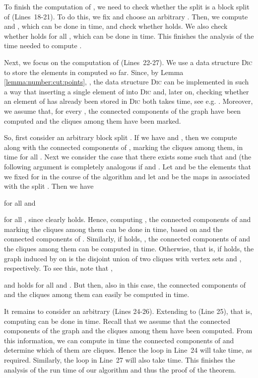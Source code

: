 \documentclass[12pt]{article}
\begin{document}
To finish the computation of , we need to check whether
the split  is a block split of  (Lines~18-21). 
To do this, we fix  and choose an arbitrary .
Then, we compute  and ,
which can be done in  time, and check whether 
 holds.
We also check whether  holds for all ,
which can be done in  time. 
This finishes the analysis of the time needed to compute .

Next, we focus on the computation of  (Lines~22-27).
We use a data structure \textsc{Dic}
to store the elements in  computed so far. 
Since, by Lemma \ref{lemma:number:cut:points},
, the data structure \textsc{Dic} can be implemented in such a way
that inserting a single element of  into \textsc{Dic} and, later on, 
checking whether an element of  has
already been stored in \textsc{Dic} both takes  time, see e.g. \cite{gon-00a}.
Moreover, we assume that, for every ,
the connected components of the graph  have been computed
and the cliques among them have been marked. 

So, first consider an arbitrary block split .
If we have  and , then
we compute  along with the connected components of ,
marking the cliques among them, in  time for all . 
Next we consider the case that there exists some 
such that  and  (the following argument is completely 
analogous if  and .
Let  and  be the elements that we fixed
for  in the course of the algorithm and
let  and  be the maps in 
associated with the split .
Then we have 
 
for all  and

for all , since  clearly holds.
Hence, computing , the connected components of  
and marking the cliques among them can be done in  time, based on 
 and the connected components of .
Similarly, if  holds,
, the connected components of 
and the cliques among them can be computed in  time.
Otherwise, that is, if  holds,
the graph induced by 
on  is the disjoint union of two cliques
with vertex sets  and , respectively. 
To see this, note that
,
 
and 
holds for all  and .
But then, also in this case, the connected components of 
and the cliques among them can easily be computed in  time.

It remains to consider an arbitrary  (Lines 24-26).
Extending  to  (Line 25), that is, computing
 can be done in  time.
Recall that we assume that the connected components of the 
graph  and the cliques among them have been computed.
From this information, we can compute in  time
the connected components of  and determine which
of them are cliques. Hence the loop in Line~24 will take  time,
as required. Similarly, the loop in Line~27 will also take  time.
This finishes the analysis of the run time of our algorithm and thus the proof of
the theorem.
\hfill\\
\end{document}

